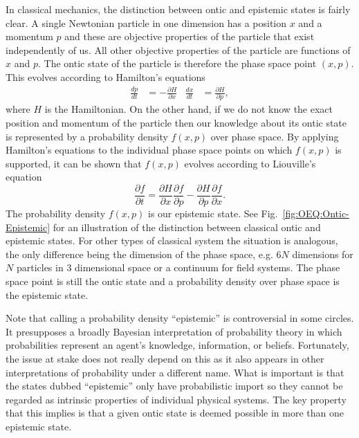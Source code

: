 \documentclass[DIV=calc,paper=a4,fontsize=11pt,twocolumn]{scrartcl} %
\theoremstyle{definition}
\theoremstyle{plain}
\begin{document}
In classical mechanics, the distinction between ontic and epistemic
states is fairly clear.  A single Newtonian particle in one dimension
has a position $x$ and a momentum $p$ and these are objective
properties of the particle that exist independently of us.  All other
objective properties of the particle are functions of $x$ and $p$.
The ontic state of the particle is therefore the phase space point
$(x,p)$.  This evolves according to Hamilton's equations
\begin{align}
\frac{d p}{d t} & = -\frac{\partial H}{\partial x} & \frac{d x}{d t}
& = \frac{\partial H}{\partial p},
\end{align}
where $H$ is the Hamiltonian.  On the other hand, if we do not know
the exact position and momentum of the particle then our knowledge
about its ontic state is represented by a probability density $f(x,p)$
over phase space.  By applying Hamilton's equations to the individual
phase space points on which $f(x,p)$ is supported, it can be shown
that $f(x,p)$ evolves according to Liouville's equation
\begin{equation}
\frac{\partial f}{\partial t} = \frac{\partial H}{\partial
x}\frac{\partial f}{\partial p} - \frac{\partial H}{\partial
p}\frac{\partial f}{\partial x}.
\end{equation}
The probability density $f(x,p)$ is our epistemic state.  See
Fig.~\ref{fig:OEQ:Ontic-Epistemic} for an illustration of the
distinction between classical ontic and epistemic states.  For other
types of classical system the situation is analogous, the only
difference being the dimension of the phase space, e.g. $6N$
dimensions for $N$ particles in $3$ dimensional space or a continuum
for field systems.  The phase space point is still the ontic state and
a probability density over phase space is the epistemic state.

Note that calling a probability density ``epistemic'' is controversial
in some circles.  It presupposes a broadly Bayesian interpretation of
probability theory in which probabilities represent an agent's
knowledge, information, or beliefs.  Fortunately, the issue at stake
does not really depend on this as it also appears in other
interpretations of probability under a different name.  What is
important is that the states dubbed ``epistemic'' only have
probabilistic import so they cannot be regarded as intrinsic
properties of individual physical systems.  The key property that this
implies is that a given ontic state is deemed possible in more than
one epistemic state.
\end{document}
